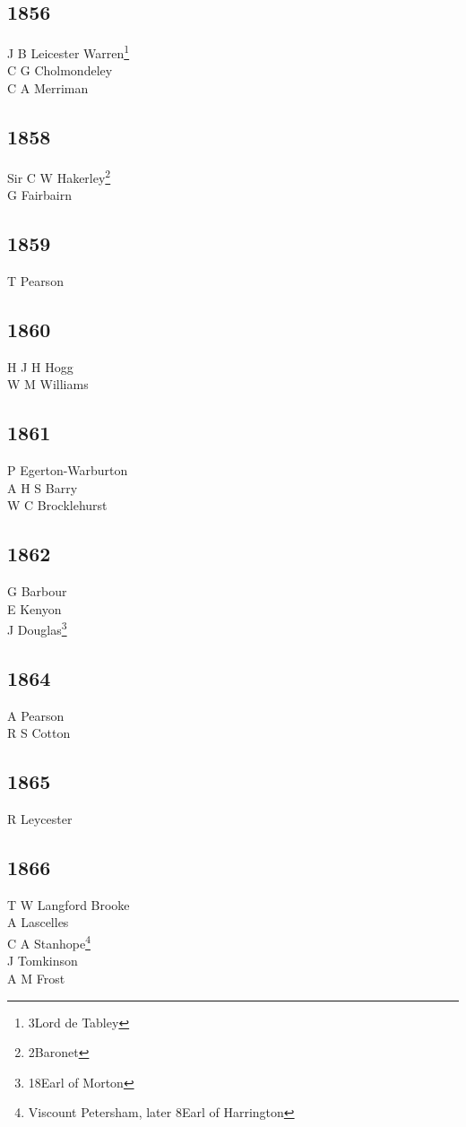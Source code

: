 \begin{multicols}{3}
  \subsection*{1856}
  J B Leicester Warren\footnote{3\rd Lord de Tabley} \\
  C G Cholmondeley \\
  C A Merriman \\
  \subsection*{1858}
  Sir C W Hakerley\footnote{2\nd Baronet} \\
  G Fairbairn \\
  \subsection*{1859}
  T Pearson \\
  \subsection*{1860}
  H J H Hogg \\
  W M Williams \\
  \subsection*{1861}
  P Egerton-Warburton \\
  A H S Barry \\
  W C Brocklehurst \\
  \subsection*{1862}
  G Barbour \\
  E Kenyon \\
  J Douglas\footnote{18\nth Earl of Morton} \\
  \subsection*{1864}
  A Pearson \\
  R S Cotton \\
  \subsection*{1865}
  R Leycester \\
  \subsection*{1866}
  T W Langford Brooke \\
  A Lascelles \\
  C A Stanhope\footnote{Viscount Petersham, later 8\nth Earl of Harrington} \\
  J Tomkinson \\
  A M Frost \\

\end{multicols}
